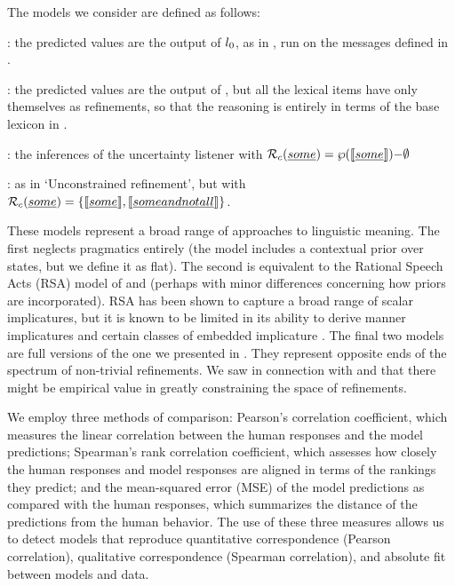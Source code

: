 \documentclass[leqno,12pt]{article}
\begin{document}
The models we consider are defined as follows:
%
\begin{examples}
\item 
  \begin{examples}
  \item {}: the predicted values are the output
    of $l_{0}$, as in , run on the messages
    defined in .
  \item {}: the predicted values are the
    output of , but all the lexical items have only
    themselves as refinements, so that the reasoning is entirely in
    terms of the base lexicon in .
  \item {}: the inferences of the
    uncertainty listener  with $\mathcal{R}_{c}(\emph{some})
    = \wp(\llbracket\emph{some}\rrbracket){-}\emptyset$
  \item {}: as in `Unconstrained
    refinement', but with $\mathcal{R}_{c}(\emph{some}) =
    \left\{ \llbracket\emph{some}\rrbracket, \llbracket\emph{some and not all}\rrbracket \right\}$.
  \end{examples}
\end{examples}

These models represent a broad range of approaches to linguistic
meaning. The first neglects pragmatics entirely (the model includes a
contextual prior over states, but we define it as flat). The second is
equivalent to the Rational Speech Acts (RSA) model of
\citet{Frank:Goodman:2012} and \citet{Goodman:Stuhlmuller:2013}
(perhaps with minor differences concerning how priors are
incorporated). RSA has been shown to capture a broad range of scalar
implicatures, but it is known to be limited in its ability to derive
manner implicatures and certain classes of embedded implicature
\citep{Bergen:Goodman:Levy:2012,Bergen:Levy:Goodman:2014}. The final
two models are full versions of the one we presented in
. They represent opposite ends of the spectrum of
non-trivial refinements. We saw in connection with
 and  that there
might be empirical value in greatly constraining the space of
refinements.


We employ three methods of comparison: Pearson's correlation
coefficient, which measures the linear correlation between the human
responses and the model predictions; Spearman's rank correlation
coefficient, which assesses how closely the human responses and model
responses are aligned in terms of the rankings they predict; and the
mean-squared error (MSE) of the model predictions as compared with the
human responses, which summarizes the distance of the predictions
from the human behavior. The use of these three measures allows us to
detect models that reproduce quantitative correspondence (Pearson
correlation), qualitative correspondence (Spearman correlation), and absolute
fit between models and data.
\end{document}

